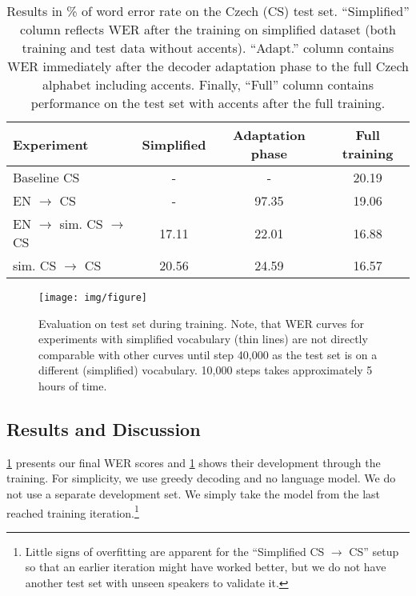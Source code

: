 \begin{table}[t]
	\small\centering
	\begin{tabular}{lc|cc}
		\bf Experiment & \bf Simplified & \bf Adaptation phase & \bf Full training \\
		\hline
		Baseline CS & - &  - &  20.19 \\
		EN $\rightarrow$ CS & -  & 97.35 &  19.06  \\
		EN $\rightarrow$ sim. CS $\rightarrow$ CS & 17.11  & 22.01 &  16.88 \\
		sim. CS $\rightarrow$ CS & 20.56  &  24.59 &  16.57  \\
	\end{tabular}
	\caption[Results in \% of WER on the Czech (CS) test set]{Results in \% of word error rate on the Czech (CS) test set. ``Simplified''
    column reflects WER after the training on simplified dataset (both training and test data
    without accents). ``Adapt.'' column contains WER 
    immediately after the decoder adaptation phase to the full Czech alphabet including accents.
    Finally, ``Full'' column contains performance on the test set with accents 
    after the full training.}
	\label{tab:results}
\end{table}

\begin{landscape}
	\begin{figure}[t]
		\texttt{[image: img/figure]}
		\caption[Evaluation on test set during CS ASR training]{Evaluation on test set during training. %
			Note, that WER curves for experiments with simplified vocabulary (thin lines) are not directly comparable with other curves until step 40,000 as the test set is on a different (simplified) vocabulary. 10,000 steps takes approximately 5 hours of time.}
		\label{fig:training}
	\end{figure}
\end{landscape}

\subsection{Results and Discussion}
\label{sec:results}


\cref{tab:results} presents our final WER scores and \cref{fig:training} shows their development through the training. For simplicity, we use greedy decoding and no language model. We do not use a separate development set. We simply take the model from the last reached training iteration.\footnote{Little signs of overfitting are apparent for the ``Simplified CS $\rightarrow$ CS'' setup so that an earlier iteration might have worked better, but we do not have another test set with unseen speakers to validate it.}

